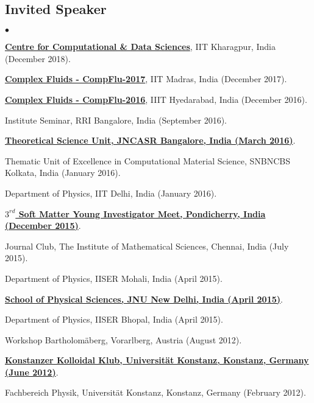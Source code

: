 \documentclass[margin,line]{res}
\newenvironment{list2}{
  \begin{list}{$\bullet$}{%
      \setlength{\itemsep}{0in}
      \setlength{\parsep}{0in} \setlength{\parskip}{0in}
      \setlength{\topsep}{0in} \setlength{\partopsep}{0in} 
      \setlength{\leftmargin}{0.2in}}}{\end{list}}
\begin{document}
\begin{resume}
\section{\sc Invited Speaker}
\begin{list2}
\item \href{https://www.slideshare.net/AmitBhattacharjee14/seminar-iitkgp}{\bf Centre for Computational \& Data Sciences}, IIT 
      Kharagpur, India (December 2018).
\item \href{https://www.slideshare.net/AmitBhattacharjee14/elecnem}{\bf Complex Fluids - CompFlu-2017}, IIT Madras, India (December 2017).
\item \href{http://www.slideshare.net/AmitBhattacharjee14/nucleating-nematic-droplets}{\bf Complex Fluids - CompFlu-2016}, IIIT Hyedarabad, 
      India (December 2016).
\item Institute Seminar, RRI Bangalore, India (September 2016). 
\item \href{http://www.jncasr.ac.in/tsumain.php/TSU-Home/1/1/}{\bf Theoretical Science Unit, JNCASR Bangalore, India (March 2016)}.
\item Thematic Unit of Excellence in Computational Material Science, SNBNCBS Kolkata, India (January 2016).
\item Department of Physics, IIT Delhi, India (January 2016).
\item \href{http://www.slideshare.net/AmitBhattacharjee14/tsu-seminar-jncasr-march-2016}{\bf $3^{rd}$ Soft Matter Young Investigator Meet, 
      Pondicherry, India (December 2015)}.
\item Journal Club, The Institute of Mathematical Sciences, Chennai, India (July 2015).
\item Department of Physics, IISER Mohali, India (April 2015).
\item \href{http://www.slideshare.net/AmitBhattacharjee14/particle-and-field-based-methods-for-complex-fluids-and-soft-materials}{\bf School 
      of Physical Sciences, JNU New Delhi, India (April 2015)}.
\item Department of Physics, IISER Bhopal, India (April 2015).
\item Workshop Bartholom\"{a}berg, Vorarlberg, Austria (August 2012).  
\item \href{http://www.slideshare.net/AmitBhattacharjee14/kinetic-pathways-to-the-isotropicnematic-phase-transformation-a-mean-field-approach}{\bf 
      Konstanzer Kolloidal Klub, Universit\"at Konstanz, Konstanz, Germany (June 2012)}.
\item Fachbereich Physik, Universit\"at Konstanz, Konstanz, Germany (February 2012).

\end{list2}
\end{resume}
\end{document}
